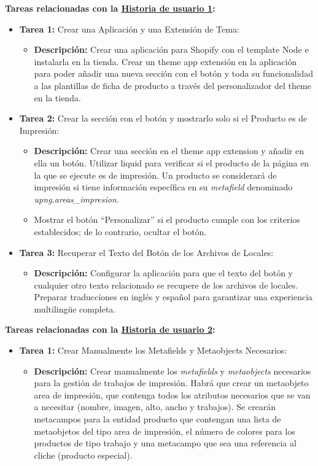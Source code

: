 \documentclass[12pt]{article}
\begin{document}
\textbf{Tareas relacionadas con la \hyperref[sec:historia1]{Historia de usuario 1}:}
\begin{itemize}
    \item \textbf{Tarea 1:} Crear una Aplicación y una Extensión de Tema:
          \begin{itemize}[label=--]
              \item \textbf{Descripción:} Crear una aplicación para Shopify con el template Node e instalarla en la tienda. Crear un theme app extensión en la aplicación para poder añadir una nueva sección con el botón y toda su funcionalidad a las plantillas de ficha de producto a través del personalizador del theme en la tienda.
          \end{itemize}
    \item \textbf{Tarea 2:} Crear la sección con el botón y mostrarlo solo si el Producto es de Impresión:
          \begin{itemize}[label=--]
              \item \textbf{Descripción:} Crear una sección en el theme app extension y añadir en ella un botón. Utilizar liquid para verificar si el producto de la página en la que se ejecute es de impresión. Un producto se considerará de impresión si tiene información específica en su \textit{metafield} denominado \textit{upng.areas\_impresion}.
              \item Mostrar el botón ``Personalizar'' si el producto cumple con los criterios establecidos; de lo contrario, ocultar el botón.
          \end{itemize}
    \item \textbf{Tarea 3:} Recuperar el Texto del Botón de los Archivos de Locales:
          \begin{itemize}[label=--]
              \item \textbf{Descripción:} Configurar la aplicación para que el texto del botón y cualquier otro texto relacionado se recupere de los archivos de locales. Preparar traducciones en inglés y español para garantizar una experiencia multilingüe completa.
          \end{itemize}
\end{itemize}

\textbf{Tareas relacionadas con la \hyperref[sec:historia2]{Historia de usuario 2}:}
\begin{itemize}
    \item \textbf{Tarea 1:} Crear Manualmente los Metafields y Metaobjects Necesarios:
          \begin{itemize}[label=--]
              \item \textbf{Descripción:} Crear manualmente los \textit{metafields} y \textit{metaobjects} necesarios para la gestión de trabajos de impresión. Habrá que crear un metaobjeto area de impresión, que contenga todos los atributos necesarios que se van a necesitar (nombre, imagen, alto, ancho y trabajos). Se crearán metacampos para la entidad producto que contengan una lista de metaobjetos del tipo area de impresión, el número de colores para los productos de tipo trabajo y una metacampo que sea una referencia al cliche (producto especial).
          \end{itemize}
\end{itemize}
\end{document}
